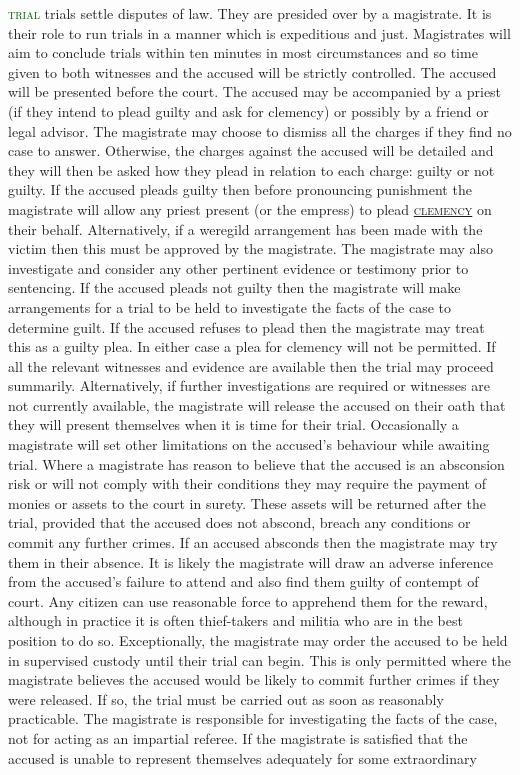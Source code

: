 \documentclass[twoside,11pt,b5paper,twocolumn]{scrbook}
\newcommand{\estcab}[1]{\textsc{\textcolor{marron}{#1}}}
\renewcommand{\paragraph}[1]{\par\noindent\markboth{#1}{#1}\estcab{\textcolor{darkgreen}{#1}}\label{#1} }
\newcommand{\see}[1]{{\estcab{\hyperref[#1]{#1}}}}
\begin{document}
\paragraph{trial} trials settle disputes of law. They are presided over by a magistrate. It is their role to run trials in a manner which is expeditious and just. Magistrates will aim to conclude trials within ten minutes in most circumstances and so time given to both witnesses and the accused will be strictly controlled. The accused will be presented before the court. The accused may be accompanied by a priest (if they intend to plead guilty and ask for clemency) or possibly by a friend or legal advisor. The magistrate may choose to dismiss all the charges if they find no case to answer. Otherwise, the charges against the accused will be detailed and they will then be asked how they plead in relation to each charge: guilty or not guilty. If the accused pleads guilty then before pronouncing punishment the magistrate will allow any priest present (or the empress) to plead \see{clemency} on their behalf. Alternatively, if a weregild arrangement has been made with the victim then this must be approved by the magistrate. The magistrate may also investigate and consider any other pertinent evidence or testimony prior to sentencing. If the accused pleads not guilty then the magistrate will make arrangements for a trial to be held to investigate the facts of the case to determine guilt. If the accused refuses to plead then the magistrate may treat this as a guilty plea. In either case a plea for clemency will not be permitted. If all the relevant witnesses and evidence are available then the trial may proceed summarily. Alternatively, if further investigations are required or witnesses are not currently available, the magistrate will release the accused on their oath that they will present themselves when it is time for their trial. Occasionally a magistrate will set other limitations on the accused’s behaviour while awaiting trial. Where a magistrate has reason to believe that the accused is an absconsion risk or will not comply with their conditions they may require the payment of monies or assets to the court in surety. These assets will be returned after the trial, provided that the accused does not abscond, breach any conditions or commit any further crimes. If an accused absconds then the magistrate may try them in their absence. It is likely the magistrate will draw an adverse inference from the accused's failure to attend and also find them guilty of contempt of court. Any citizen can use reasonable force to apprehend them for the reward, although in practice it is often thief-takers and militia who are in the best position to do so. Exceptionally, the magistrate may order the accused to be held in supervised custody until their trial can begin. This is only permitted where the magistrate believes the accused would be likely to commit further crimes if they were released. If so, the trial must be carried out as soon as reasonably practicable. The magistrate is responsible for investigating the facts of the case, not for acting as an impartial referee. If the magistrate is satisfied that the accused is unable to represent themselves adequately for some extraordinary 
\end{document}
